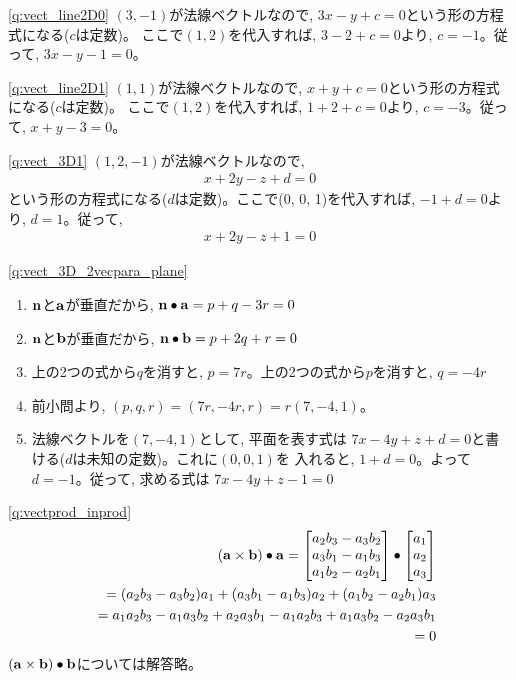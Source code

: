 \ref{q:vect_line2D0}  $(3, -1)$が法線ベクトルなので, $3x-y+c=0$という形の方程式になる($c$は定数)。
ここで$(1, 2)$を代入すれば, $3-2+c=0$より, $c=-1$。従って, $3x-y-1=0$。
\hv

\ref{q:vect_line2D1}  $(1, 1)$が法線ベクトルなので, $x+y+c=0$という形の方程式になる($c$は定数)。
ここで$(1, 2)$を代入すれば, $1+2+c=0$より, $c=-3$。従って, $x+y-3=0$。
\hv

\ref{q:vect_3D1}  $(1, 2, -1)$が法線ベクトルなので, 
\begin{eqnarray*}x+2y-z+d=0\end{eqnarray*}
という形の方程式になる($d$は定数)。ここで(0, 0, 1)を代入すれば, $-1+d=0$より, $d=1$。従って, 
\begin{eqnarray*}x+2y-z+1=0\end{eqnarray*}\hv

\ref{q:vect_3D_2vecpara_plane}
\begin{enumerate}
\item ${\bf n}$と${\bf a}$が垂直だから, ${\bf n}\bullet{\bf a}=p+q-3r=0$
\item ${\bf n}$と${\bf b}$が垂直だから, ${\bf n}\bullet{\bf b}=p+2q+r=0$
\item 上の2つの式から$q$を消すと, $p=7r$。上の2つの式から$p$を消すと, $q=-4r$
\item 前小問より, $(p, q, r)=(7r, -4r, r)=r(7, -4, 1)$。
\item 法線ベクトルを$(7, -4, 1)$として, 平面を表す式は
$7x-4y+z+d=0$と書ける($d$は未知の定数)。これに$(0,0,1)$を
入れると, $1+d=0$。よって$d=-1$。従って, 求める式は
$7x-4y+z-1=0$
\end{enumerate}
\hv

\ref{q:vectprod_inprod}　
\begin{eqnarray*}
&&({\bf a}\times{\bf b})\bullet{\bf a}=\begin{bmatrix}
a_2b_3-a_3b_2\\
a_3b_1-a_1b_3\\
a_1b_2-a_2b_1\\
\end{bmatrix}\bullet
\begin{bmatrix}
a_1\\
a_2\\
a_3\\
\end{bmatrix}
\\
&&=(a_2b_3-a_3b_2)a_1+(a_3b_1-a_1b_3)a_2+(a_1b_2-a_2b_1)a_3\\
&&=a_1a_2b_3-a_1a_3b_2+a_2a_3b_1-a_1a_2b_3+a_1a_3b_2-a_2a_3b_1\\
&&=0
\end{eqnarray*}
$({\bf a}\times{\bf b})\bullet{\bf b}$については解答略。\hv


